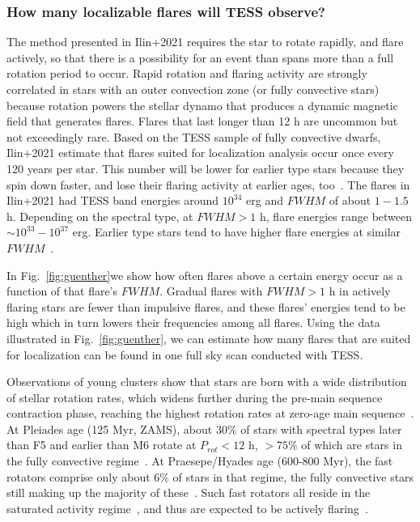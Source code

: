 \documentclass[proof]{WileyASNA-v1}
\begin{document}
\subsubsection{How many localizable flares will TESS observe?}
The method presented in Ilin+2021 requires the star to rotate rapidly, and flare actively, so that there is a possibility for an event than spans more than a full rotation period to occur. 
Rapid rotation and flaring activity are strongly correlated in stars with an outer convection zone (or fully convective stars) because rotation powers the stellar dynamo that produces a dynamic magnetic field that generates flares.
Flares that last longer than 12 h are uncommon but not exceedingly rare.
Based on the TESS sample of fully convective dwarfs, Ilin+2021 estimate that flares suited for localization analysis occur once every 120 years per star. This number will be lower for earlier type stars because they spin down faster, and lose their flaring activity at earlier ages, too~\citep{kowalski2009,hilton2010,chang2015,ilin2019,ilin2021}.
The flares in Ilin+2021 had TESS band energies around $10^{34}$ erg  and $FWHM$ of about $1-1.5$ h. 
Depending on the spectral type, at $FWHM > 1$ h, flare energies range between $\sim 10^{33}-10^{37}$ erg. Earlier type stars tend to have higher flare energies at similar $FWHM$~\citep{guenther2020}.

In Fig.~\ref{fig:guenther}we show how often flares above a certain energy occur as a function of that flare's $FWHM$. Gradual flares with $FWHM > 1$ h in actively flaring stars are fewer than impulsive flares, and these flares' energies tend to be high which in turn lowers their frequencies among all flares. Using the data illustrated in Fig.~\ref{fig:guenther}, we can estimate how many flares that are suited for localization can be found in one full sky scan conducted with TESS.

Observations of young clusters show that stars are born with a wide distribution of stellar rotation rates, which widens further during the pre-main sequence contraction phase, reaching the highest rotation rates at zero-age main sequence~\citep[ZAMS,][, and references therein]{johnstone2015,johnstone2021}.
At Pleiades age (125 Myr, ZAMS), about $30\%$ of stars with spectral types later than F5 and earlier than M6 rotate at $P_{rot}<12$ h, $>75\%$ of which are stars in the fully convective regime~\citep{rebull2016}. 
At Praesepe/Hyades age (600-800 Myr), the fast rotators comprise only about $6\%$ of stars in that regime, the fully convective stars still making up the majority of these~\citep{douglas2019}.
Such fast rotators all reside in the saturated activity regime~\citep{wright2011,wright2016,wright2018,newton2017}, and thus are expected to be actively flaring~\citep{doorsselaere2017, clarke2018}.
\end{document}
